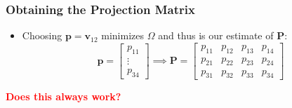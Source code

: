 \begin{frame}
    \frametitle{Obtaining the Projection Matrix}
    \begin{itemize}
        \item Choosing $\mathbf{p} = \mathbf{v}_{12}$ minimizes $\Omega$ and thus is our estimate of $\mathbf{P}$:
        \begin{equation*}
            \mathbf{p} = \begin{bmatrix}
            p_{11} \\
            \vdots \\
            p_{34}
            \end{bmatrix}
            \implies
            \mathbf{P} = \begin{bmatrix}
            p_{11} & p_{12} & p_{13} & p_{14} \\
            p_{21} & p_{22} & p_{23} & p_{24} \\
            p_{31} & p_{32} & p_{33} & p_{34}
            \end{bmatrix}
        \end{equation*}
    \end{itemize}
    \vspace{1cm}
    \centering
    \textcolor{red}{\bfseries Does this always work?}
\end{frame}

